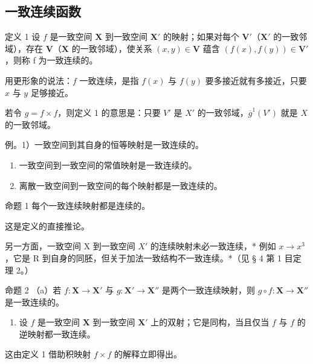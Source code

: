 \subsection{一致连续函数}

定义 1 设 \(f\) 是一致空间 \(\mathbf{X}\) 到一致空间 \(\mathbf{X}'\) 的映射；如果对每个 \(\mathbf{V}'\)（\(\mathbf{X}'\) 的一致邻域），存在 \(\mathbf{V}\)（\(\mathbf{X}\) 的一致邻域），使关系 \((x,y)\in \mathbf{V}\) 蕴含 \((f(x),f(y))\in \mathbf{V}'\)，则称 f 为一致连续的。

用更形象的说法：\(f\) 一致连续，是指 \(f(x)\) 与 \(f(y)\) 要多接近就有多接近，只要 \(x\) 与 \(y\) 足够接近。

若令 \(g = f \times f\)，则定义 1 的意思是：只要 \(V'\) 是 \(X'\) 的一致邻域，\(\overline{g}^1(V')\) 就是 \(X\) 的一致邻域。

例。1）一致空间到其自身的恒等映射是一致连续的。

\begin{enumerate}
\def\labelenumi{\arabic{enumi})}
\setcounter{enumi}{1}
\item
  一致空间到一致空间的常值映射是一致连续的。
\item
  离散一致空间到一致空间的每个映射都是一致连续的。
\end{enumerate}

命题 1 每个一致连续映射都是连续的。

这是定义的直接推论。

另一方面，一致空间 X 到一致空间 \(X'\) 的连续映射未必一致连续，* 例如 \(x \to x^{3}\)，它是 R 到自身的同胚，但关于加法一致结构不一致连续。*（见 § 4 第 1 目定理 2。）

命题 2 （a）若 \(f: \mathbf{X} \to \mathbf{X}'\) 与 \(g: \mathbf{X}' \to \mathbf{X}''\) 是两个一致连续映射，则 \(g \circ f: \mathbf{X} \to \mathbf{X}''\) 是一致连续的。

\begin{enumerate}
\def\labelenumi{(\alph{enumi})}
\setcounter{enumi}{1}
\tightlist
\item
  设 \(f\) 是一致空间 \(\mathbf{X}\) 到一致空间 \(\mathbf{X}'\) 上的双射；它是同构，当且仅当 \(f\) 与 \(f\) 的逆映射都一致连续。
\end{enumerate}

这由定义 1 借助积映射 \(f \times f\) 的解释立即得出。

